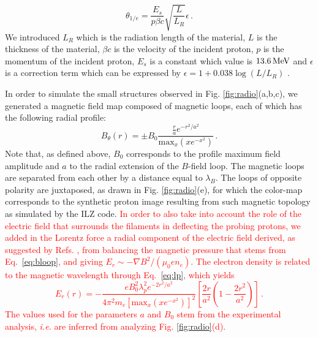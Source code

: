 \documentclass[aps,twocolumn,showpacs,superscriptaddress]{revtex4}
\begin{document}
\begin{equation}
\theta_{1/e}  = \frac{E_s}{p\beta c} \sqrt{\frac{L}{L_R}} \epsilon  \, .
\end{equation}
We introduced $L_R$ which is the radiation length of the material, $L$ is the thickness of the material, $\beta c$ is the velocity of the incident proton, $p$ is the momentum of the incident proton, $E_s$ is a constant which value is $13.6\,\rm MeV$ and  $\epsilon$ is a correction term which can be expressed by $\epsilon  = 1 + 0.038 \log\left(L/L_R\right)$ \cite{EPJ_Groom_2000}. 

In order to simulate the small structures observed in Fig. \ref{fig:radio}(a,b,c), we generated a magnetic field map composed of magnetic loops, each of which has the following radial profile:
\begin{equation}\label{eq:bloop}
B_\theta(r)  = \pm B_0  \frac{ \frac{r}{a} e^{-r^2/a^2} }{\mathrm{max}_x(xe^{-x^2})} \, .
\end{equation} %
Note that, as defined above, $B_0$ corresponds to the profile maximum field amplitude and $a$ to the radial extension of the $B$-field loop.
The magnetic loops are separated from each other by a distance equal to $\lambda_B$.
The loops of opposite polarity are juxtaposed, as drawn in Fig. \ref{fig:radio}(e), for which the color-map corresponds to the synthetic proton image resulting from such magnetic topology as simulated by the ILZ code.
\textcolor{red}{
In order to also take into account the role of the electric field that surrounds the filaments in deflecting the probing protons, we added in the Lorentz force a radial component of the electric field  derived, as suggested by Refs. \cite{POP_Dieckmann_2009, POP_Bret_Gremillet_2010}, from balancing the magnetic pressure that stems from Eq.~\eqref{eq:bloop}, and giving $E_r \sim -\nabla B^2 /(\mu_0e n_e)$. The  electron density is related to the magnetic wavelength through Eq.~\eqref{eq:lp}, which yields
\begin{equation}\label{eq:eloop}
E_r(r) = -\frac{  eB_0^2\lambda_p^2   e^{-2r^2/a^2}}{4\pi^2 m_e [\mathrm{max}_x(xe^{-x^2})]^2} \left[ \frac{2r}{a^2}\left( 1-\frac{2r^2}{a^2}\right)  \right]  \, .
\end{equation} 
The values used for the parameters $a$ and $B_0$ stem from the experimental analysis, \emph{i.e.} are inferred from analyzing Fig. \ref{fig:radio}(d). 
}
\end{document}
